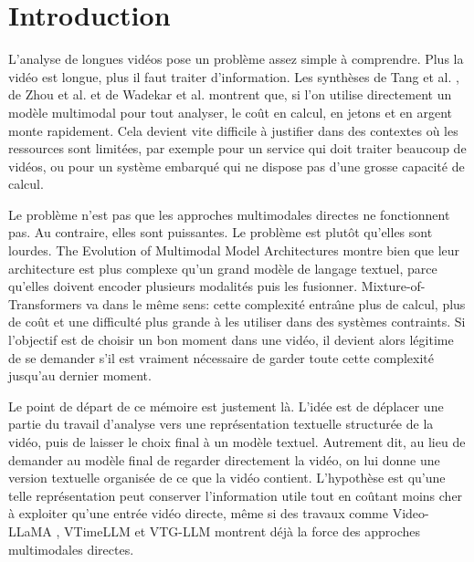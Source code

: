\chapter{Introduction}

L'analyse de longues vid\'eos pose un probl\`eme assez simple \`a comprendre. Plus la vid\'eo est longue, plus il faut traiter d'information. Les synth\`eses de Tang et al. \cite{tang2023}, de Zhou et al. \cite{zhou2024} et de Wadekar et al. \cite{wadekar2024_evolution_of_multimodal_model_architectures} montrent que, si l'on utilise directement un mod\`ele multimodal pour tout analyser, le co\^ut en calcul, en jetons et en argent monte rapidement. Cela devient vite difficile \`a justifier dans des contextes o\`u les ressources sont limit\'ees, par exemple pour un service qui doit traiter beaucoup de vid\'eos, ou pour un syst\`eme embarqu\'e qui ne dispose pas d'une grosse capacit\'e de calcul.

Le probl\`eme n'est pas que les approches multimodales directes ne fonctionnent pas. Au contraire, elles sont puissantes. Le probl\`eme est plut\^ot qu'elles sont lourdes. The Evolution of Multimodal Model Architectures \cite{wadekar2024_evolution_of_multimodal_model_architectures} montre bien que leur architecture est plus complexe qu'un grand mod\`ele de langage textuel, parce qu'elles doivent encoder plusieurs modalit\'es puis les fusionner. Mixture-of-Transformers \cite{liang2025_mixture_of_transformers} va dans le m\^eme sens: cette complexit\'e entra\^\i ne plus de calcul, plus de co\^ut et une difficult\'e plus grande \`a les utiliser dans des syst\`emes contraints. Si l'objectif est de choisir un bon moment dans une vid\'eo, il devient alors l\'egitime de se demander s'il est vraiment n\'ecessaire de garder toute cette complexit\'e jusqu'au dernier moment.

Le point de d\'epart de ce m\'emoire est justement l\`a. L'id\'ee est de d\'eplacer une partie du travail d'analyse vers une repr\'esentation textuelle structur\'ee de la vid\'eo, puis de laisser le choix final \`a un mod\`ele textuel. Autrement dit, au lieu de demander au mod\`ele final de regarder directement la vid\'eo, on lui donne une version textuelle organis\'ee de ce que la vid\'eo contient. L'hypoth\`ese est qu'une telle repr\'esentation peut conserver l'information utile tout en co\^utant moins cher \`a exploiter qu'une entr\'ee vid\'eo directe, m\^eme si des travaux comme Video-LLaMA \cite{anonymous2023_videollama}, VTimeLLM \cite{huang2024_vtimeLLM} et VTG-LLM \cite{guo2024_vtgLLM} montrent d\'ej\`a la force des approches multimodales directes.

